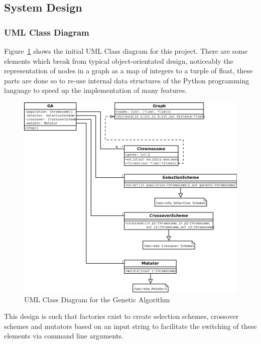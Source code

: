 \documentclass[10pt, a4paper]{article}
\begin{document}
\subsection{System Design}




\subsubsection{UML Class Diagram}

Figure~\ref{fig:uml} shows the initial UML Class diagram for this project.
There are some elements which break from typical object-orientated design,
noticeably the representation of nodes in a graph as a map of integers to a
turple of float, these parts are done so to re-use internal data structures of
the Python programming language to speed up the implementation of many 
features.

\begin{figure}[h]
\includegraphics[width=\textwidth]{img/uml.png}
\caption{UML Class Diagram for the Genetic Algorithm}
\label{fig:uml}
\end{figure}

This design is such that factories exist to create selection schemes, crossover
schemes and mutators based on an input string to facilitate the switching of
these elements via command line arguments.
\end{document}
